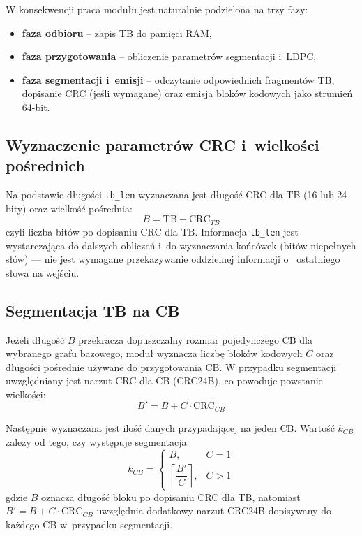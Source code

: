 W konsekwencji praca modułu jest naturalnie podzielona na trzy fazy:
\begin{itemize}
  \item \textbf{faza odbioru} -- zapis TB do pamięci RAM,
  \item \textbf{faza przygotowania} -- obliczenie parametrów segmentacji i~LDPC,
  \item \textbf{faza segmentacji i~emisji} -- odczytanie odpowiednich fragmentów TB, dopisanie CRC (jeśli wymagane) oraz emisja bloków kodowych jako strumień 64-bit.
\end{itemize}

\subsection{Wyznaczenie parametrów CRC i~wielkości pośrednich}
\label{subsec:ldpc_prep_crc_b}

Na podstawie długości \texttt{tb\_len} wyznaczana jest długość CRC dla TB (16 lub 24 bity) oraz wielkość pośrednia:
\[
B = \mathrm{TB} + \mathrm{CRC}_{TB}
\]
czyli liczba bitów po dopisaniu CRC dla TB. Informacja \texttt{tb\_len} jest wystarczająca do dalszych obliczeń i~do wyznaczania końcówek (bitów niepełnych słów) --- nie jest wymagane przekazywanie oddzielnej informacji o~ ostatniego słowa na wejściu.

\subsection{Segmentacja TB na CB}
\label{subsec:ldpc_prep_segmentation}

Jeżeli długość $B$ przekracza dopuszczalny rozmiar pojedynczego CB dla wybranego grafu bazowego, moduł wyznacza liczbę bloków kodowych $C$ oraz długości pośrednie używane do przygotowania CB. W przypadku segmentacji uwzględniany jest narzut CRC dla CB (CRC24B), co powoduje powstanie wielkości:
\[
B' = B + C \cdot \mathrm{CRC}_{CB}
\]

Następnie wyznaczana jest ilość danych przypadającej na jeden CB. Wartość $k_{CB}$ zależy od tego, czy występuje segmentacja:
\[
k_{CB} =
\begin{cases}
B, & C = 1 \\
\left\lceil \dfrac{B'}{C} \right\rceil, & C > 1
\end{cases}
\]
gdzie $B$ oznacza długość bloku po dopisaniu CRC dla TB, natomiast $B' = B + C \cdot \mathrm{CRC}_{CB}$ uwzględnia dodatkowy narzut CRC24B dopisywany do każdego CB w~przypadku segmentacji.


